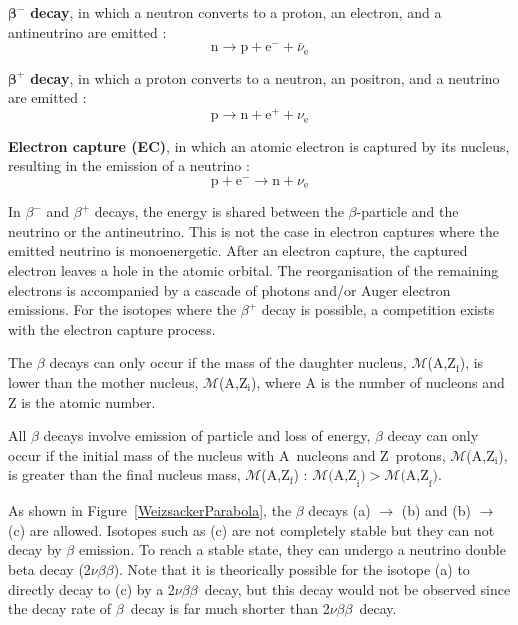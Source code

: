 \documentclass[main.tex]{subfiles}
\begin{document}
\bigskip


\NI $\boldsymbol{\beta^-}$ \textbf{decay}, in which a neutron converts to a proton, an electron, and a antineutrino are emitted :
\begin{equation}
\text{n} \rightarrow \text{p} + \text{e}^- + \bar{\nu}_\text{e}
\end{equation}


\bigskip


\NI $\boldsymbol{\beta^+}$ \textbf{decay}, in which a proton converts to a neutron, an positron, and a neutrino are emitted :
\begin{equation}
\text{p} \rightarrow \text{n} + \text{e}^+ + \nu_\text{e}
\end{equation} 


\bigskip 

 
\NI \textbf{Electron capture (EC)}, in which an atomic electron is captured by its nucleus, resulting in the emission of a neutrino :
\begin{equation}
\text{p} + \text{e}^- \rightarrow \text{n} + \nu_{\text{e}}
\end{equation} 
 

\NI In $\beta^-$ and $\beta^+$ decays, the energy is shared between the $\beta$-particle and the neutrino or the antineutrino. This is not the case in electron captures where the emitted neutrino is monoenergetic. After an electron capture, the captured electron leaves a hole in the atomic orbital. The reorganisation of the remaining electrons is accompanied by a cascade of photons and/or Auger electron emissions. For the isotopes where the $\beta^+$ decay is possible, a competition exists with the electron capture process.


\bigskip


\NI The $\beta$ decays can only occur if the mass of the daughter nucleus, $\mathcal{M}$(A,Z$_\text{f}$), is lower than the mother nucleus, $\mathcal{M}$(A,Z$_\text{i}$), where A is the number of nucleons and Z is the atomic number.  


\bigskip


\NI All $\beta$ decays involve emission of particle and loss of energy, $\beta$ decay can only occur if the initial mass of the nucleus with A~nucleons and Z~protons, $\mathcal{M}$(A,Z$_\text{i}$), is greater than the final nucleus mass, $\mathcal{M}$(A,Z$_\text{f}$) : $\mathcal{M} \text{(A,Z}_\text{i}) > \mathcal{M} \text{(A,Z}_\text{f})$.


\bigskip


\NI As shown in Figure~\ref{WeizsackerParabola}, the $\beta$ decays (a) $\rightarrow$ (b) and (b) $\rightarrow$ (c) are allowed. Isotopes such as (c) are not completely stable but they can not decay by $\beta$ emission. To reach a stable state, they can undergo a neutrino double beta decay (2$\nu\beta\beta$). Note that it is theorically possible for the isotope (a) to directly decay to (c) by a 2$\nu\beta\beta$~decay, but this decay would not be observed since the decay rate of $\beta$~decay is far much shorter than 2$\nu\beta\beta$~decay.
\end{document}
